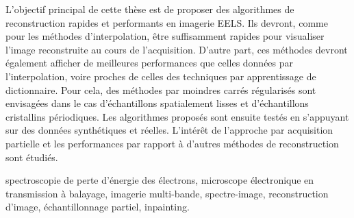 \begin{fullwidth}
L’objectif principal de cette thèse est de proposer des algorithmes de reconstruction rapides et performants en imagerie EELS. Ils devront, comme pour les méthodes d’interpolation, être suffisamment rapides pour visualiser l’image reconstruite au cours de l’acquisition. D’autre part, ces méthodes devront également afficher de meilleures performances que celles données par l’interpolation, voire proches de celles des techniques par apprentissage de dictionnaire. Pour cela, des méthodes par moindres carrés régularisés sont envisagées dans le cas d’échantillons spatialement lisses et d’échantillons cristallins périodiques. Les algorithmes proposés sont ensuite testés en s’appuyant sur des données synthétiques et réelles. L’intérêt de l’approche par acquisition partielle et les performances par rapport à d’autres méthodes de reconstruction sont étudiés. 


\vspace{1em}
%
spectroscopie de perte d’énergie des électrons, 
microscope électronique en transmission à balayage, 
imagerie multi-bande, 
spectre-image,
reconstruction d'image, 
échantillonnage partiel,
inpainting.

\end{fullwidth}